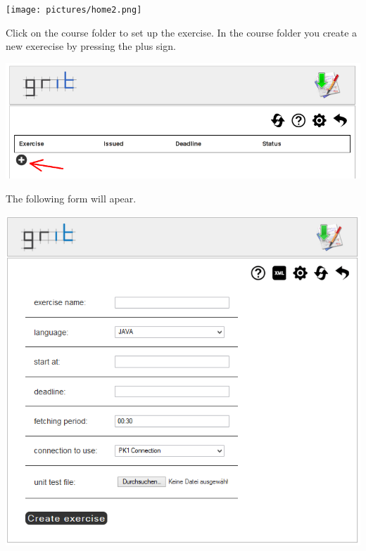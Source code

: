 \documentclass[10pt,a4paper, titlepage, toc=idx]{scrreprt}
\theoremstyle{definition}
\theoremstyle{plain}
\begin{document}
\begin{center}
	\texttt{[image: pictures/home2.png]}

\end{center}
Click on the course folder to set up the exercise. In the course folder you create a new exerecise by pressing the plus sign.

\begin{center}
	\includegraphics[width=.55\textwidth]{pictures/exercise_overview.png}
\end{center}

The following form will apear.

\begin{center}
	\includegraphics[width=.55\textwidth]{pictures/create_exercise.png}
\end{center}
\end{document}
